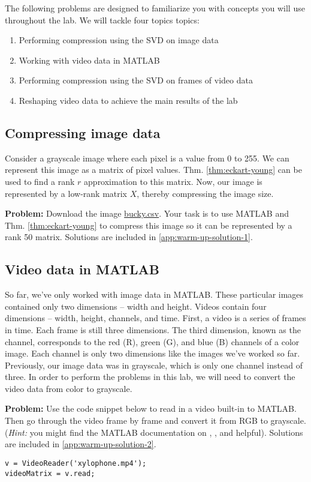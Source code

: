The following problems are designed to familiarize you with concepts you will use throughout the lab. We will tackle four topics topics:
\begin{enumerate}
	\item Performing compression using the SVD on image data
	\item Working with video data in MATLAB
	\item Performing compression using the SVD on frames of video data
	\item Reshaping video data to achieve the main results of the lab
\end{enumerate}

\subsection{Compressing image data}
 Consider a grayscale image where each pixel is a value from 0 to 255. We can represent this image as a matrix of pixel values. Thm. \ref{thm:eckart-young} can be used to find a rank $r$ approximation to this matrix. Now, our image is represented by a low-rank matrix $X$, thereby compressing the image size.

\textbf{Problem:} Download the image \href{http://www.laurentlessard.com/teaching/ece532/homework/bucky.csv}{bucky.csv}. Your task is to use MATLAB and Thm. \ref{thm:eckart-young} to compress this image so it can be represented by a rank 50 matrix. Solutions are included in \ref{app:warm-up-solution-1}.

\subsection{Video data in MATLAB}
So far, we've only worked with image data in MATLAB. These particular images contained only two dimensions -- width and height. Videos contain four dimensions -- width, height, channels, and time. First, a video is a series of frames in time. Each frame is still three dimensions. The third dimension, known as the channel, corresponds to the red (R), green (G), and blue (B) channels of a color image. Each channel is only two dimensions like the images we've worked so far. Previously, our image data was in grayscale, which is only one channel instead of three. In order to perform the problems in this lab, we will need to convert the video data from color to grayscale.

\textbf{Problem:} Use the code snippet below to read in a video built-in to MATLAB. Then go through the video frame by frame and convert it from RGB to grayscale. (\textit{Hint:} you might find the MATLAB documentation on , , and  helpful). Solutions are included in \ref{app:warm-up-solution-2}.
\begin{lstlisting}[style=code]
v = VideoReader('xylophone.mp4');
videoMatrix = v.read;
\end{lstlisting}

